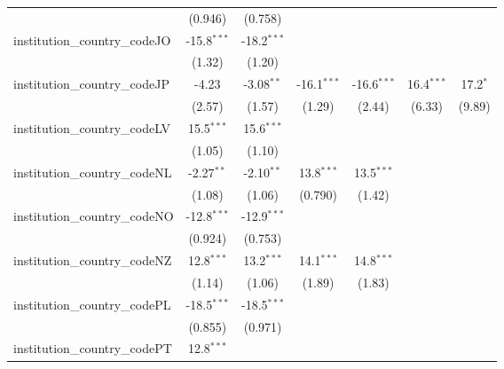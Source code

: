 \begin{tabular}{lcccccc}
                                         & (0.946)       & (0.758)       &               &               &               &   \\   
   institution\_country\_codeJO          & -15.8$^{***}$ & -18.2$^{***}$ &               &               &               &   \\   
                                         & (1.32)        & (1.20)        &               &               &               &   \\   
   institution\_country\_codeJP          & -4.23         & -3.08$^{**}$  & -16.1$^{***}$ & -16.6$^{***}$ & 16.4$^{***}$  & 17.2$^{*}$\\   
                                         & (2.57)        & (1.57)        & (1.29)        & (2.44)        & (6.33)        & (9.89)\\   
   institution\_country\_codeLV          & 15.5$^{***}$  & 15.6$^{***}$  &               &               &               &   \\   
                                         & (1.05)        & (1.10)        &               &               &               &   \\   
   institution\_country\_codeNL          & -2.27$^{**}$  & -2.10$^{**}$  & 13.8$^{***}$  & 13.5$^{***}$  &               &   \\   
                                         & (1.08)        & (1.06)        & (0.790)       & (1.42)        &               &   \\   
   institution\_country\_codeNO          & -12.8$^{***}$ & -12.9$^{***}$ &               &               &               &   \\   
                                         & (0.924)       & (0.753)       &               &               &               &   \\   
   institution\_country\_codeNZ          & 12.8$^{***}$  & 13.2$^{***}$  & 14.1$^{***}$  & 14.8$^{***}$  &               &   \\   
                                         & (1.14)        & (1.06)        & (1.89)        & (1.83)        &               &   \\   
   institution\_country\_codePL          & -18.5$^{***}$ & -18.5$^{***}$ &               &               &               &   \\   
                                         & (0.855)       & (0.971)       &               &               &               &   \\   
   institution\_country\_codePT          & 12.8$^{***}$  &               &               &               &               &   \\   

\end{tabular}

